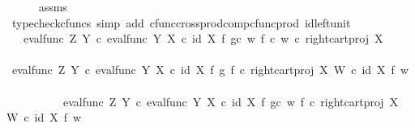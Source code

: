 \begin{isabellebody}
\ \ \ \ \isamarkupfalse%
\ assms\ \isamarkupfalse%
\ {\isacharparenleft}{\kern0pt}typecheck{\isacharunderscore}{\kern0pt}cfuncs{\isacharcomma}{\kern0pt}\ simp\ add{\isacharcolon}{\kern0pt}\ cfunc{\isacharunderscore}{\kern0pt}cross{\isacharunderscore}{\kern0pt}prod{\isacharunderscore}{\kern0pt}comp{\isacharunderscore}{\kern0pt}cfunc{\isacharunderscore}{\kern0pt}prod\ id{\isacharunderscore}{\kern0pt}left{\isacharunderscore}{\kern0pt}unit{}{\isacharparenright}{\kern0pt}\isanewline
\ \ \isamarkupfalse%
\ \isamarkupfalse%
\ {\isachardoublequoteopen}{\isachardot}{\kern0pt}{\isachardot}{\kern0pt}{\isachardot}{\kern0pt}\ {\isacharequal}{\kern0pt}\ {\isacharparenleft}{\kern0pt}eval{\isacharunderscore}{\kern0pt}func\ Z\ Y\ {\isasymcirc}\isactrlsub c\ {\isasymlangle}eval{\isacharunderscore}{\kern0pt}func\ Y\ X\ {\isasymcirc}\isactrlsub c\ {\isacharparenleft}{\kern0pt}id\ X\ {\isasymtimes}\isactrlsub f\ {\isacharparenleft}{\kern0pt}g{\isasymcirc}\isactrlsub c\ w{\isacharparenright}{\kern0pt}{\isacharparenright}{\kern0pt}{\isacharcomma}{\kern0pt}\ {\isacharparenleft}{\kern0pt}f\ {\isasymcirc}\isactrlsub c\ w{\isacharparenright}{\kern0pt}\ {\isasymcirc}\isactrlsub c\ right{\isacharunderscore}{\kern0pt}cart{\isacharunderscore}{\kern0pt}proj\ X\ {\isasymone}{\isasymrangle}{\isacharparenright}{\kern0pt}\isactrlsup {\isasymsharp}{\isachardoublequoteclose}\isanewline
\ \ \isamarkupfalse%
\ {\isacharminus}{\kern0pt}\ \isanewline
\ \ \ \ \isamarkupfalse%
\ {\isachardoublequoteopen}{\isacharparenleft}{\kern0pt}eval{\isacharunderscore}{\kern0pt}func\ Z\ Y\ {\isasymcirc}\isactrlsub c\ {\isasymlangle}eval{\isacharunderscore}{\kern0pt}func\ Y\ X\ {\isasymcirc}\isactrlsub c\ {\isacharparenleft}{\kern0pt}id\ X\ {\isasymtimes}\isactrlsub f\ g{\isacharparenright}{\kern0pt}{\isacharcomma}{\kern0pt}\ f\ {\isasymcirc}\isactrlsub c\ right{\isacharunderscore}{\kern0pt}cart{\isacharunderscore}{\kern0pt}proj\ X\ W{\isasymrangle}{\isacharparenright}{\kern0pt}\isactrlsup {\isasymsharp}\isactrlsup {\isasymflat}\ {\isasymcirc}\isactrlsub c\ {\isacharparenleft}{\kern0pt}id\ X\ {\isasymtimes}\isactrlsub f\ w{\isacharparenright}{\kern0pt}\ {\isacharequal}{\kern0pt}\ \isanewline
\ \ \ \ \ \ \ \ \ \ eval{\isacharunderscore}{\kern0pt}func\ Z\ Y\ {\isasymcirc}\isactrlsub c\ {\isasymlangle}eval{\isacharunderscore}{\kern0pt}func\ Y\ X\ {\isasymcirc}\isactrlsub c\ {\isacharparenleft}{\kern0pt}id\ X\ {\isasymtimes}\isactrlsub f\ {\isacharparenleft}{\kern0pt}g{\isasymcirc}\isactrlsub c\ w{\isacharparenright}{\kern0pt}{\isacharparenright}{\kern0pt}{\isacharcomma}{\kern0pt}\ f\ {\isasymcirc}\isactrlsub c\ right{\isacharunderscore}{\kern0pt}cart{\isacharunderscore}{\kern0pt}proj\ X\ W\ {\isasymcirc}\isactrlsub c\ {\isacharparenleft}{\kern0pt}id\ X\ {\isasymtimes}\isactrlsub f\ w{\isacharparenright}{\kern0pt}{\isasymrangle}{\isachardoublequoteclose}\isanewline

\end{isabellebody}
